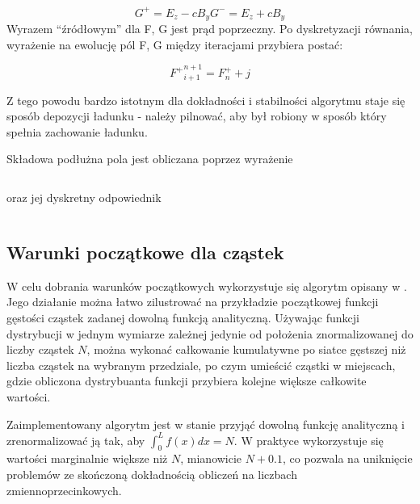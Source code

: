     \begin{equation}
        G^{+} = E_z - c B_y
        G^{-} = E_z + c B_y
        \label{eqn:Birdsall-electromagnetic-quantities-alternate-axes}
    \end{equation}
    Wyrazem ``źródłowym'' dla F, G jest prąd poprzeczny. Po dyskretyzacji równania, wyrażenie na ewolucję pól F, G między
    iteracjami przybiera postać:

    \begin{equation}
        {F^{+}}^{n+1}_{i+1} = F^{+}_{n} + j%
    \end{equation}

    Z tego powodu bardzo istotnym dla dokładności i stabilności algorytmu staje się sposób depozycji ładunku - należy pilnować,
    aby był robiony w sposób który spełnia zachowanie ładunku.

    Składowa podłużna pola jest obliczana poprzez wyrażenie

    \begin{equation}
    \end{equation}

    oraz jej dyskretny odpowiednik

    \begin{equation}
    \end{equation}

    \subsection{Warunki początkowe dla cząstek}

    W celu dobrania warunków początkowych wykorzystuje się algorytm opisany w .%
    Jego działanie można łatwo zilustrować na przykładzie początkowej funkcji gęstości cząstek zadanej
    dowolną funkcją analityczną. %
    Używając funkcji dystrybucji w jednym wymiarze zależnej jedynie od położenia znormalizowanej do
    liczby cząstek $N$, można wykonać całkowanie kumulatywne po siatce gęstszej niż liczba cząstek
    na wybranym przedziale, po czym umieścić cząstki w miejscach, gdzie obliczona dystrybuanta funkcji
    przybiera kolejne większe całkowite wartości.


    Zaimplementowany algorytm jest w stanie przyjąć dowolną funkcję analityczną %
    i zrenormalizować ją tak, aby $\int_0^L f(x) dx = N$. W praktyce wykorzystuje się wartości marginalnie większe
    niż $N$, mianowicie $N+0.1$, co pozwala na uniknięcie problemów ze skończoną dokładnością obliczeń
    na liczbach zmiennoprzecinkowych.

